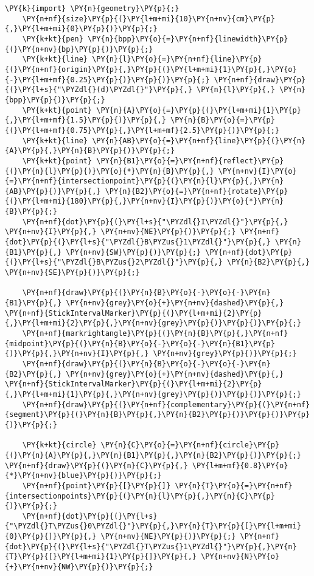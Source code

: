\begin{Verbatim}[commandchars=\\\{\}]
    \PY{k}{import} \PY{n}{geometry}\PY{p}{;}
    \PY{n+nf}{size}\PY{p}{(}\PY{l+m+mi}{10}\PY{n+nv}{cm}\PY{p}{,}\PY{l+m+mi}{0}\PY{p}{)}\PY{p}{;}
    \PY{k+kt}{pen} \PY{n}{bpp}\PY{o}{=}\PY{n+nf}{linewidth}\PY{p}{(}\PY{n+nv}{bp}\PY{p}{)}\PY{p}{;}
    \PY{k+kt}{line} \PY{n}{l}\PY{o}{=}\PY{n+nf}{line}\PY{p}{(}\PY{n+nf}{origin}\PY{p}{,}\PY{p}{(}\PY{l+m+mi}{1}\PY{p}{,}\PY{o}{-}\PY{l+m+mf}{0.25}\PY{p}{)}\PY{p}{)}\PY{p}{;} \PY{n+nf}{draw}\PY{p}{(}\PY{l+s}{"\PYZdl{}(d)\PYZdl{}"}\PY{p}{,} \PY{n}{l}\PY{p}{,} \PY{n}{bpp}\PY{p}{)}\PY{p}{;}
    \PY{k+kt}{point} \PY{n}{A}\PY{o}{=}\PY{p}{(}\PY{l+m+mi}{1}\PY{p}{,}\PY{l+m+mf}{1.5}\PY{p}{)}\PY{p}{,} \PY{n}{B}\PY{o}{=}\PY{p}{(}\PY{l+m+mf}{0.75}\PY{p}{,}\PY{l+m+mf}{2.5}\PY{p}{)}\PY{p}{;}
    \PY{k+kt}{line} \PY{n}{AB}\PY{o}{=}\PY{n+nf}{line}\PY{p}{(}\PY{n}{A}\PY{p}{,}\PY{n}{B}\PY{p}{)}\PY{p}{;}
    \PY{k+kt}{point} \PY{n}{B1}\PY{o}{=}\PY{n+nf}{reflect}\PY{p}{(}\PY{n}{l}\PY{p}{)}\PY{o}{*}\PY{n}{B}\PY{p}{,} \PY{n+nv}{I}\PY{o}{=}\PY{n+nf}{intersectionpoint}\PY{p}{(}\PY{n}{l}\PY{p}{,}\PY{n}{AB}\PY{p}{)}\PY{p}{,} \PY{n}{B2}\PY{o}{=}\PY{n+nf}{rotate}\PY{p}{(}\PY{l+m+mi}{180}\PY{p}{,}\PY{n+nv}{I}\PY{p}{)}\PY{o}{*}\PY{n}{B}\PY{p}{;}
    \PY{n+nf}{dot}\PY{p}{(}\PY{l+s}{"\PYZdl{}I\PYZdl{}"}\PY{p}{,} \PY{n+nv}{I}\PY{p}{,} \PY{n+nv}{NE}\PY{p}{)}\PY{p}{;} \PY{n+nf}{dot}\PY{p}{(}\PY{l+s}{"\PYZdl{}B\PYZus{}1\PYZdl{}"}\PY{p}{,} \PY{n}{B1}\PY{p}{,} \PY{n+nv}{SW}\PY{p}{)}\PY{p}{;} \PY{n+nf}{dot}\PY{p}{(}\PY{l+s}{"\PYZdl{}B\PYZus{}2\PYZdl{}"}\PY{p}{,} \PY{n}{B2}\PY{p}{,} \PY{n+nv}{SE}\PY{p}{)}\PY{p}{;}

    \PY{n+nf}{draw}\PY{p}{(}\PY{n}{B}\PY{o}{-}\PY{o}{-}\PY{n}{B1}\PY{p}{,} \PY{n+nv}{grey}\PY{o}{+}\PY{n+nv}{dashed}\PY{p}{,} \PY{n+nf}{StickIntervalMarker}\PY{p}{(}\PY{l+m+mi}{2}\PY{p}{,}\PY{l+m+mi}{2}\PY{p}{,}\PY{n+nv}{grey}\PY{p}{)}\PY{p}{)}\PY{p}{;}
    \PY{n+nf}{markrightangle}\PY{p}{(}\PY{n}{B}\PY{p}{,}\PY{n+nf}{midpoint}\PY{p}{(}\PY{n}{B}\PY{o}{-}\PY{o}{-}\PY{n}{B1}\PY{p}{)}\PY{p}{,}\PY{n+nv}{I}\PY{p}{,} \PY{n+nv}{grey}\PY{p}{)}\PY{p}{;}
    \PY{n+nf}{draw}\PY{p}{(}\PY{n}{B}\PY{o}{-}\PY{o}{-}\PY{n}{B2}\PY{p}{,} \PY{n+nv}{grey}\PY{o}{+}\PY{n+nv}{dashed}\PY{p}{,} \PY{n+nf}{StickIntervalMarker}\PY{p}{(}\PY{l+m+mi}{2}\PY{p}{,}\PY{l+m+mi}{1}\PY{p}{,}\PY{n+nv}{grey}\PY{p}{)}\PY{p}{)}\PY{p}{;}
    \PY{n+nf}{draw}\PY{p}{(}\PY{n+nf}{complementary}\PY{p}{(}\PY{n+nf}{segment}\PY{p}{(}\PY{n}{B}\PY{p}{,}\PY{n}{B2}\PY{p}{)}\PY{p}{)}\PY{p}{)}\PY{p}{;}

    \PY{k+kt}{circle} \PY{n}{C}\PY{o}{=}\PY{n+nf}{circle}\PY{p}{(}\PY{n}{A}\PY{p}{,}\PY{n}{B1}\PY{p}{,}\PY{n}{B2}\PY{p}{)}\PY{p}{;} \PY{n+nf}{draw}\PY{p}{(}\PY{n}{C}\PY{p}{,} \PY{l+m+mf}{0.8}\PY{o}{*}\PY{n+nv}{blue}\PY{p}{)}\PY{p}{;}
    \PY{n+nf}{point}\PY{p}{[}\PY{p}{]} \PY{n}{T}\PY{o}{=}\PY{n+nf}{intersectionpoints}\PY{p}{(}\PY{n}{l}\PY{p}{,}\PY{n}{C}\PY{p}{)}\PY{p}{;}
    \PY{n+nf}{dot}\PY{p}{(}\PY{l+s}{"\PYZdl{}T\PYZus{}0\PYZdl{}"}\PY{p}{,}\PY{n}{T}\PY{p}{[}\PY{l+m+mi}{0}\PY{p}{]}\PY{p}{,} \PY{n+nv}{NE}\PY{p}{)}\PY{p}{;} \PY{n+nf}{dot}\PY{p}{(}\PY{l+s}{"\PYZdl{}T\PYZus{}1\PYZdl{}"}\PY{p}{,}\PY{n}{T}\PY{p}{[}\PY{l+m+mi}{1}\PY{p}{]}\PY{p}{,} \PY{n+nv}{N}\PY{o}{+}\PY{n+nv}{NW}\PY{p}{)}\PY{p}{;}


\end{Verbatim}
